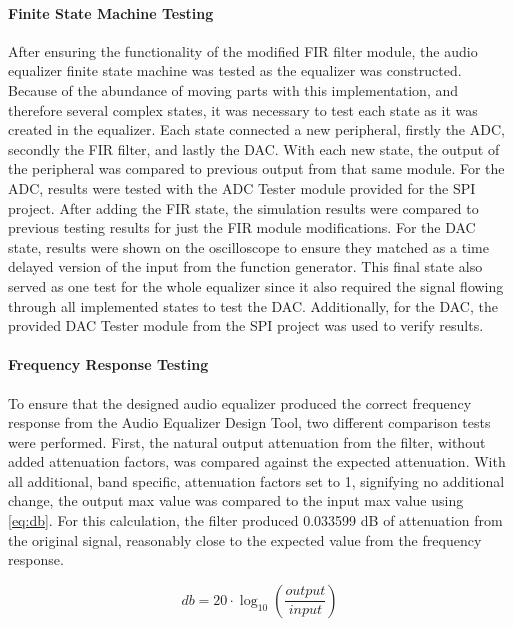 \documentclass[journal]{IEEEtran} %
\begin{document}
\paragraph{Finite State Machine Testing}After ensuring the functionality of the modified FIR filter module, the audio equalizer finite state machine was tested as the equalizer was constructed. Because of the abundance of moving parts with this implementation, and therefore several complex states, it was necessary to test each state as it was created in the equalizer. Each state connected a new peripheral, firstly the ADC, secondly the FIR filter, and lastly the DAC. With each new state, the output of the peripheral was compared to previous output from that same module. For the ADC, results were tested with the ADC Tester module provided for the SPI project. After adding the FIR state, the simulation results were compared to previous testing results for just the FIR module modifications. For the DAC state, results were shown on the oscilloscope to ensure they matched as a time delayed version of the input from the function generator. This final state also served as one test for the whole equalizer since it also required the signal flowing through all implemented states to test the DAC. Additionally, for the DAC, the provided DAC Tester module from the SPI project was used to verify results. 

\paragraph{Frequency Response Testing} To ensure that the designed audio equalizer produced the correct frequency response from the Audio Equalizer Design Tool, two different comparison tests were performed. First, the natural output attenuation from the filter, without added attenuation factors, was compared against the expected attenuation. With all additional, band specific, attenuation factors set to 1, signifying no additional change, the output max value was compared to the input max value using \eqref{eq:db}. For this calculation, the filter produced 0.033599 dB of attenuation from the original signal, reasonably close to the expected value from the frequency response. 

\begin{equation}
    db = 20 \cdot \log_{10}(\frac{output}{input})
    \label{eq:db}
\end{equation}{}
\end{document}
